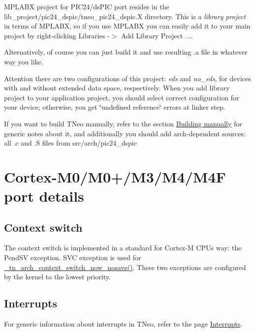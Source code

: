 M\+P\+L\+A\+B\+X project for P\+I\+C24/ds\+P\+I\+C port resides in the {\ttfamily lib\+\_\+project/pic24\+\_\+dspic/tneo\+\_\+pic24\+\_\+dspic.\+X} directory. This is a {\itshape library project} in terms of M\+P\+L\+A\+B\+X, so if you use M\+P\+L\+A\+B\+X you can easily add it to your main project by right-\/clicking {\ttfamily Libraries -\/$>$ Add Library Project ...}.

Alternatively, of course you can just build it and use resulting {\ttfamily .a} file in whatever way you like.

\begin{DoxyAttention}{Attention}
there are two configurations of this project\+: {\itshape eds} and {\itshape  no\+\_\+eds}, for devices with and without extended data space, respectively. When you add library project to your application project, you should select correct configuration for your device; otherwise, you get \char`\"{}undefined reference\char`\"{} errors at linker step.
\end{DoxyAttention}
If you want to build T\+Neo manually, refer to the section \hyperlink{building_building_generic__manual}{Building manually} for generic notes about it, and additionally you should add arch-\/dependent sources\+: all {\ttfamily .c} and {\ttfamily .S} files from {\ttfamily src/arch/pic24\+\_\+dspic}\hypertarget{arch_specific_cortex_m_details}{}\section{Cortex-\/\+M0/\+M0+/\+M3/\+M4/\+M4\+F port details}\label{arch_specific_cortex_m_details}
\hypertarget{arch_specific_cortex_m_context_switch}{}\subsection{Context switch}\label{arch_specific_cortex_m_context_switch}
The context switch is implemented in a standard for Cortex-\/\+M C\+P\+Us way\+: the Pend\+S\+V exception. S\+V\+C exception is used for {\ttfamily \hyperlink{tn__arch_8h_afd5f43f42f5645de164ba6d13d3a4bcf}{\+\_\+tn\+\_\+arch\+\_\+context\+\_\+switch\+\_\+now\+\_\+nosave()}}. These two exceptions are configured by the kernel to the lowest priority.\hypertarget{arch_specific_cortex_m_interrupts}{}\subsection{Interrupts}\label{arch_specific_cortex_m_interrupts}
For generic information about interrupts in T\+Neo, refer to the page \hyperlink{interrupts}{Interrupts}.

